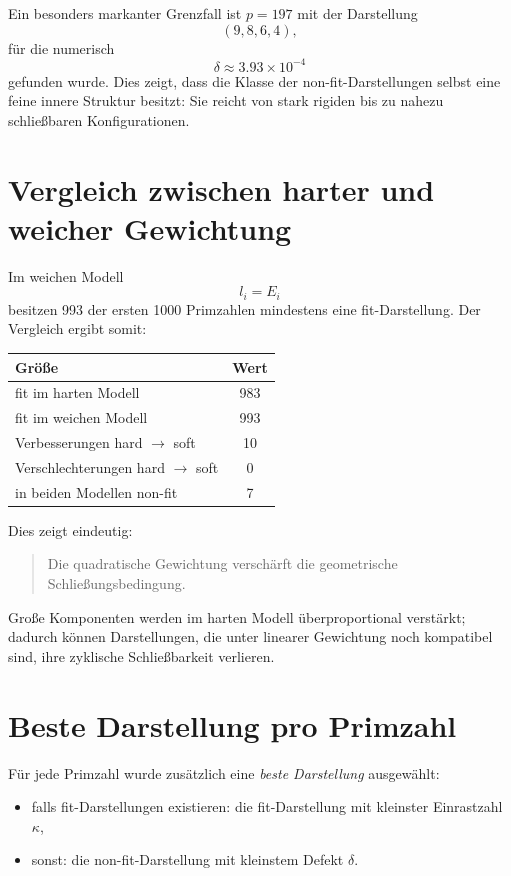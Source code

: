 \documentclass[11pt,a4paper]{article}
\theoremstyle{remark}
\begin{document}
	Ein besonders markanter Grenzfall ist \(p=197\) mit der Darstellung
	\[
	(9,8,6,4),
	\]
	für die numerisch
	\[
	\delta \approx 3.93\times 10^{-4}
	\]
	gefunden wurde. 
	Dies zeigt, dass die Klasse der non-fit-Darstellungen selbst eine feine innere Struktur besitzt: 
	Sie reicht von stark rigiden bis zu nahezu schließbaren Konfigurationen.
	
	\section{Vergleich zwischen harter und weicher Gewichtung}
	
	Im weichen Modell
	\[
	l_i=E_i
	\]
	besitzen 993 der ersten 1000 Primzahlen mindestens eine fit-Darstellung. 
	Der Vergleich ergibt somit:
	
	\begin{center}
		\begin{tabular}{lc}
			\toprule
			Größe & Wert \\
			\midrule
			fit im harten Modell & 983 \\
			fit im weichen Modell & 993 \\
			Verbesserungen hard \(\to\) soft & 10 \\
			Verschlechterungen hard \(\to\) soft & 0 \\
			in beiden Modellen non-fit & 7 \\
			\bottomrule
		\end{tabular}
	\end{center}
	
	Dies zeigt eindeutig:
	
	\begin{quote}
		Die quadratische Gewichtung verschärft die geometrische Schließungsbedingung.
	\end{quote}
	
	Große Komponenten werden im harten Modell überproportional verstärkt; dadurch können Darstellungen, die unter linearer Gewichtung noch kompatibel sind, ihre zyklische Schließbarkeit verlieren.
	
	\section{Beste Darstellung pro Primzahl}
	
	Für jede Primzahl wurde zusätzlich eine \emph{beste Darstellung} ausgewählt:
	
	\begin{itemize}
		\item falls fit-Darstellungen existieren: die fit-Darstellung mit kleinster Einrastzahl \(\kappa\),
		\item sonst: die non-fit-Darstellung mit kleinstem Defekt \(\delta\).
	\end{itemize}
	
\end{document}
